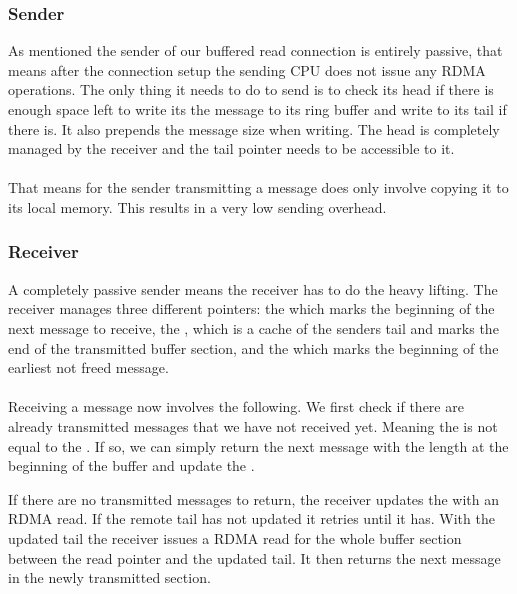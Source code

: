 \subsubsection{Sender}
As mentioned the sender of our buffered read connection is entirely passive, that means after the connection setup the sending
CPU does not issue any RDMA operations. The only thing it needs to do to send is to check its head if there is enough space
left to write its the message to its ring buffer and write to its tail if there is. It also prepends the message size when 
writing. The head is completely managed by the receiver and the tail pointer needs to be accessible to it.

\paragraph{} That means for the sender transmitting a message does only involve copying it to its local memory. This results in
a very low sending overhead.

\subsubsection{Receiver}
A completely passive sender means the receiver has to do the heavy lifting. The receiver manages three different pointers: 
the  which marks the beginning of the next message to receive, the , which is a cache of
the senders tail and marks the end of the transmitted buffer section, and the  which marks the beginning of 
the earliest not freed message.

\paragraph{} Receiving a message now involves the following. We first check if there are already transmitted messages that 
we have not received yet. Meaning the  is not equal to the . If so, we can simply 
return the next message with the length at the beginning of the buffer and update the .

If there are no transmitted messages to return, the receiver updates the  with an RDMA read. If the remote
tail has not updated it retries until it has. With the updated tail the receiver issues a RDMA read for the whole buffer 
section between the read pointer and the updated tail. It then returns the next message in the newly transmitted section.

